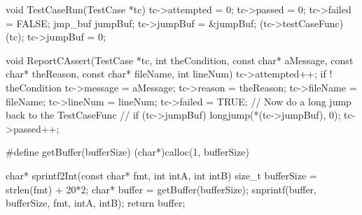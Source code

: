 \startCCode
void TestCaseRun(TestCase *tc) {
  tc->attempted = 0;
  tc->passed    = 0;
  tc->failed    = FALSE;
  jmp_buf jumpBuf;
  tc->jumpBuf = &jumpBuf;
  (tc->testCaseFunc)(tc);
  tc->jumpBuf = 0;
}

void ReportCAssert(TestCase *tc,
                   int theCondition,
                   const char* aMessage,
                   const char* theReason,
                   const char* fileName,
                   int lineNum) {
  tc->attempted++;
  if ! theCondition {
    tc->message  = aMessage;
    tc->reason   = theReason;
    tc->fileName = fileName;
    tc->lineNum  = lineNum;
    tc->failed   = TRUE;
    // Now do a long jump back to the TestCaseFunc
    //
    if (tc->jumpBuf) longjump(*(tc->jumpBuf), 0);
  }
  tc->passed++;
}

#define getBuffer(bufferSize) (char*)calloc(1, bufferSize)

char* sprintf2Int(const char* fmt,
                  int intA, int intB) {
  size_t bufferSize = strlen(fmt) + 20*2;
  char* buffer = getBuffer(bufferSize);
  snprintf(buffer, bufferSize, fmt, intA, intB);
  return buffer;
}

